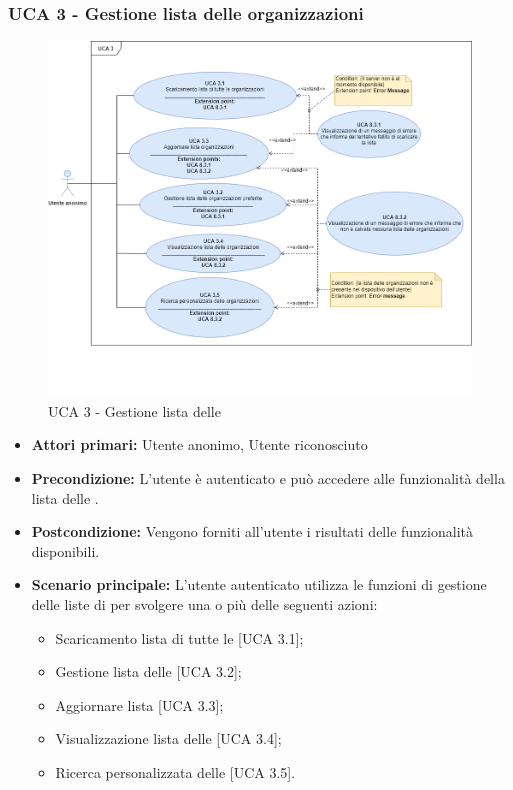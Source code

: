 \subsubsection{UCA 3 - Gestione lista delle organizzazioni}%
\begin{figure}[h!]
	\centering
	\includegraphics[scale=0.5, center]{Sezioni/UseCase/Immagini/UCA3.png}
	\caption{UCA 3 - Gestione lista delle }
\end{figure} 

\begin{itemize}
\item \textbf{Attori primari:} Utente anonimo, Utente riconosciuto
\item \textbf{Precondizione:} L'utente è autenticato e può accedere alle funzionalità della lista delle .
\item \textbf{Postcondizione:} Vengono forniti all'utente i risultati delle funzionalità disponibili.
\item \textbf{Scenario principale:} L'utente autenticato utilizza le funzioni di gestione delle liste di  per svolgere una o più delle seguenti azioni:
	\begin{itemize}
		\item Scaricamento lista di tutte le  [UCA 3.1];
		\item Gestione lista delle  [UCA 3.2];
		\item Aggiornare lista  [UCA 3.3];
		\item Visualizzazione lista delle  [UCA 3.4];
		\item Ricerca personalizzata delle  [UCA 3.5].
	\end{itemize}
\end{itemize}

